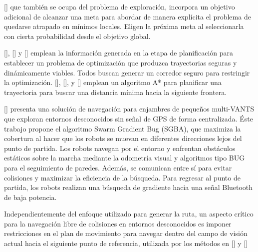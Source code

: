 \citeauthor{OLEYNIKOVA2018}[] que también se ocupa del problema de exploración, incorpora un objetivo adicional de alcanzar una meta para abordar de manera explícita el problema de quedarse atrapado en mínimos locales. Eligen la próxima meta al seleccionarla con cierta probabilidad desde el objetivo global.

\citeauthor{MOHTA2017}[], \citeauthor{GAO2018}[] y \citeauthor{LIN2017}[] emplean la información generada en la etapa de planificación para establecer un problema de optimización que produzca trayectorias seguras y dinámicamente viables. Todos buscan generar un corredor seguro para restringir la optimización. \citeauthor{MOHTA2017}[], \citeauthor{LIN2017}[], y \citeauthor{FLORENCE2018}[] emplean un algoritmo A* para planificar una trayectoria para buscar una distancia mínima hacia la siguiente frontera.

\cite{BUG2019}[] presenta una soluci\'{o}n de navegaci\'{o}n para enjambres de peque\~{n}os multi-VANTS que exploran entornos desconocidos sin se\~{n}al de GPS de forma centralizada. \'{E}ste trabajo propone el algoritmo Swarm Gradient Bug (SGBA), que maximiza la cobertura al hacer que los robots se muevan en diferentes direcciones lejos del punto de partida. Los robots navegan por el entorno y enfrentan obst\'{a}culos est\'{a}ticos sobre la marcha mediante la odometr\'{i}a visual y algoritmos tipo BUG para el seguimiento de paredes. Adem\'{a}s, se comunican entre s\'{i} para evitar colisiones y maximizar la eficiencia de la b\'{u}squeda. Para regresar al punto de partida, los robots realizan una b\'{u}squeda de gradiente hacia una se\~{n}al Bluetooth de baja potencia.


Independientemente del enfoque utilizado para generar la ruta, un aspecto crítico para la navegación libre de colisiones en entornos desconocidos es imponer restricciones en el plan de movimiento para navegar dentro del campo de visión actual hacia el siguiente punto de referencia, utilizada por los métodos en \citeauthor{RACER2022}[] y \citeauthor{BARTOLOMEI2023}[]


